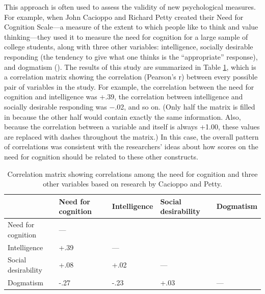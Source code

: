 \documentclass[
]{krantz}
\begin{document}
This approach is often used to assess the validity of new psychological measures. For example, when John Cacioppo and Richard Petty created their Need for Cognition Scale---a measure of the extent to which people like to think and value thinking---they used it to measure the need for cognition for a large sample of college students, along with three other variables: intelligence, socially desirable responding (the tendency to give what one thinks is the ``appropriate'' response), and dogmatism (). The results of this study are summarized in Table \ref{tab:nfc}, which is a correlation matrix showing the correlation (Pearson's r) between every possible pair of variables in the study. For example, the correlation between the need for cognition and intelligence was +.39, the correlation between intelligence and socially desirable responding was −.02, and so on. (Only half the matrix is filled in because the other half would contain exactly the same information. Also, because the correlation between a variable and itself is always +1.00, these values are replaced with dashes throughout the matrix.) In this case, the overall pattern of correlations was consistent with the researchers' ideas about how scores on the need for cognition should be related to these other constructs.

\begin{table}

\caption{\label{tab:nfc}Correlation matrix showing correlations among the need for cognition and three other variables based on research by Cacioppo and Petty.}
\centering
\begin{tabular}[t]{l|l|l|l|l}
\hline
 & Need for cognition & Intelligence & Social desirability & Dogmatism\\
\hline
Need for cognition & — &  &  & \\
\hline
Intelligence & +.39 & — &  & \\
\hline
Social desirability & +.08 & +.02 & — & \\
\hline
Dogmatism & -.27 & -.23 & +.03 & —\\
\hline
\end{tabular}
\end{table}
\end{document}
